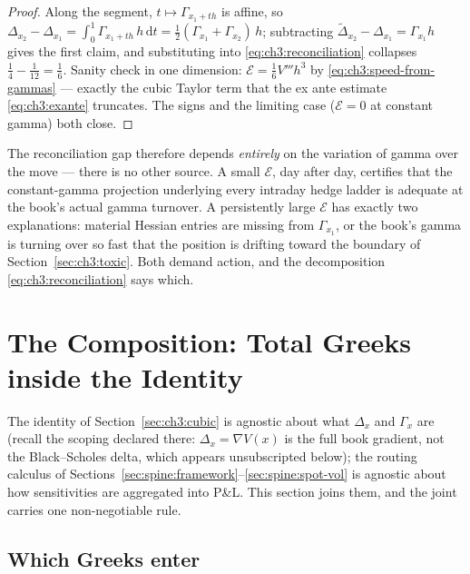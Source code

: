 \documentclass[11pt]{book}
\theoremstyle{plain}
\theoremstyle{definition}
\theoremstyle{remark}
\newcommand{\dd}{\mathrm{d}}                                  %
\begin{document}
\begin{proof}
Along the segment, $t \mapsto \Gamma_{x_1 + t h}$ is affine, so
$\Delta_{x_2} - \Delta_{x_1}
 = \int_0^1 \Gamma_{x_1 + t h}\, h \,\dd t
 = \tfrac{1}{2}(\Gamma_{x_1} + \Gamma_{x_2})\, h$;
subtracting $\tilde{\Delta}_{x_2} - \Delta_{x_1} = \Gamma_{x_1} h$ gives the
first claim, and substituting into \eqref{eq:ch3:reconciliation} collapses
$\tfrac{1}{4} - \tfrac{1}{12} = \tfrac{1}{6}$. Sanity check in one dimension:
$\mathcal{E} = \tfrac{1}{6} V''' h^3$ by
\eqref{eq:ch3:speed-from-gammas} --- exactly the cubic Taylor term that the
ex ante estimate \eqref{eq:ch3:exante} truncates. The signs and the limiting
case ($\mathcal{E} = 0$ at constant gamma) both close.
\end{proof}

The reconciliation gap therefore depends \emph{entirely} on the variation of
gamma over the move --- there is no other source. A small $\mathcal{E}$,
day after day, certifies that the constant-gamma projection underlying every
intraday hedge ladder is adequate at the book's actual gamma turnover. A
persistently large $\mathcal{E}$ has exactly two explanations: material
Hessian entries are missing from $\Gamma_{x_1}$, or the book's gamma is
turning over so fast that the position is drifting toward the boundary of
Section~\ref{sec:ch3:toxic}. Both demand action, and the decomposition
\eqref{eq:ch3:reconciliation} says which.

\section{The Composition: Total Greeks inside the Identity}
\label{sec:ch3:composition}

The identity of Section~\ref{sec:ch3:cubic} is agnostic about what
$\Delta_x$ and $\Gamma_x$ are (recall the scoping declared there:
$\Delta_x = \nabla V(x)$ is the full book gradient, not the Black--Scholes
delta, which appears unsubscripted below); the routing calculus of
Sections~\ref{sec:spine:framework}--\ref{sec:spine:spot-vol} is agnostic
about how sensitivities are aggregated into P\&L. This section joins them,
and the joint carries one non-negotiable rule.

\subsection{Which Greeks enter}\label{sec:ch3:which-greeks}
\end{document}
